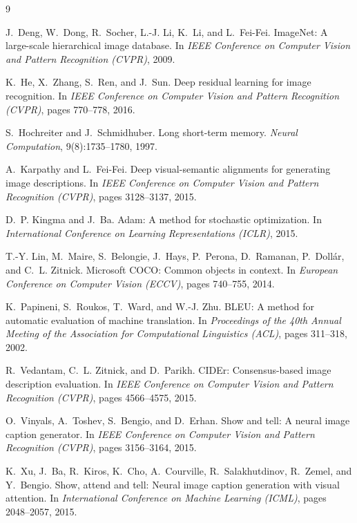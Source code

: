 \documentclass{article}
\begin{document}

\begin{thebibliography}{9}

J.~Deng, W.~Dong, R.~Socher, L.-J. Li, K.~Li, and L.~Fei-Fei.
\newblock ImageNet: A large-scale hierarchical image database.
\newblock In \emph{IEEE Conference on Computer Vision and Pattern Recognition
  (CVPR)}, 2009.

K.~He, X.~Zhang, S.~Ren, and J.~Sun.
\newblock Deep residual learning for image recognition.
\newblock In \emph{IEEE Conference on Computer Vision and Pattern Recognition
  (CVPR)}, pages 770--778, 2016.

S.~Hochreiter and J.~Schmidhuber.
\newblock Long short-term memory.
\newblock \emph{Neural Computation}, 9(8):1735--1780, 1997.

A.~Karpathy and L.~Fei-Fei.
\newblock Deep visual-semantic alignments for generating image descriptions.
\newblock In \emph{IEEE Conference on Computer Vision and Pattern Recognition
  (CVPR)}, pages 3128--3137, 2015.

D.~P. Kingma and J.~Ba.
\newblock Adam: A method for stochastic optimization.
\newblock In \emph{International Conference on Learning Representations (ICLR)},
  2015.

T.-Y. Lin, M.~Maire, S.~Belongie, J.~Hays, P.~Perona, D.~Ramanan, P.~Doll\'{a}r,
  and C.~L. Zitnick.
\newblock Microsoft COCO: Common objects in context.
\newblock In \emph{European Conference on Computer Vision (ECCV)}, pages
  740--755, 2014.

K.~Papineni, S.~Roukos, T.~Ward, and W.-J. Zhu.
\newblock BLEU: A method for automatic evaluation of machine translation.
\newblock In \emph{Proceedings of the 40th Annual Meeting of the Association for
  Computational Linguistics (ACL)}, pages 311--318, 2002.

R.~Vedantam, C.~L. Zitnick, and D.~Parikh.
\newblock CIDEr: Consensus-based image description evaluation.
\newblock In \emph{IEEE Conference on Computer Vision and Pattern Recognition
  (CVPR)}, pages 4566--4575, 2015.

O.~Vinyals, A.~Toshev, S.~Bengio, and D.~Erhan.
\newblock Show and tell: A neural image caption generator.
\newblock In \emph{IEEE Conference on Computer Vision and Pattern Recognition
  (CVPR)}, pages 3156--3164, 2015.

K.~Xu, J.~Ba, R.~Kiros, K.~Cho, A.~Courville, R.~Salakhutdinov, R.~Zemel, and
  Y.~Bengio.
\newblock Show, attend and tell: Neural image caption generation with visual
  attention.
\newblock In \emph{International Conference on Machine Learning (ICML)}, pages
  2048--2057, 2015.

\end{thebibliography}
\end{document}
